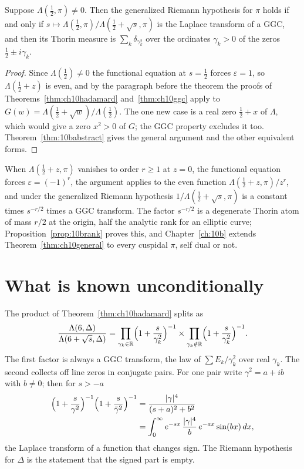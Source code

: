 \begin{theorem}\label{thm:ch10general}
Suppose $\Lambda(\frac12,\pi)\ne0$. Then the generalized Riemann hypothesis for $\pi$ holds if and only if $s\mapsto\Lambda(\frac12,\pi)/\Lambda(\frac12+\sqrt s,\pi)$ is the Laplace transform of a GGC, and then its Thorin measure is $\sum_k\delta_{\gamma_k^2}$ over the ordinates $\gamma_k>0$ of the zeros $\frac12\pm i\gamma_k$.
\end{theorem}

\begin{proof}
Since $\Lambda(\frac12)\ne0$ the functional equation at $s=\frac12$ forces $\varepsilon = 1$, so $\Lambda(\frac12+z)$ is even, and by the paragraph before the theorem the proofs of Theorems~\ref{thm:ch10hadamard} and~\ref{thm:ch10ggc} apply to $G(w) = \Lambda(\frac12+\sqrt w)/\Lambda(\frac12)$. The one new case is a real zero $\frac12+x$ of $\Lambda$, which would give a zero $x^2>0$ of $G$; the GGC property excludes it too. Theorem~\ref{thm:10babstract} gives the general argument and the other equivalent forms.
\end{proof}

When $\Lambda(\frac12+z,\pi)$ vanishes to order $r\ge1$ at $z=0$, the functional equation forces $\varepsilon=(-1)^r$, the argument applies to the even function $\Lambda(\frac12+z,\pi)/z^r$, and under the generalized Riemann hypothesis $1/\Lambda(\frac12+\sqrt s,\pi)$ is a constant times $s^{-r/2}$ times a GGC transform. The factor $s^{-r/2}$ is a degenerate Thorin atom of mass $r/2$ at the origin, half the analytic rank for an elliptic curve; Proposition~\ref{prop:10brank} proves this, and Chapter~\ref{ch:10b} extends Theorem~\ref{thm:ch10general} to every cuspidal $\pi$, self dual or not.

\section{What is known unconditionally}

The product of Theorem~\ref{thm:ch10hadamard} splits as
\[
\frac{\Lambda(6,\Delta)}{\Lambda(6+\sqrt s,\Delta)} = \prod_{\gamma_k\in\mathbb{R}}\Bigl(1+\frac{s}{\gamma_k^2}\Bigr)^{-1}\times\prod_{\gamma_k\notin\mathbb{R}}\Bigl(1+\frac{s}{\gamma_k^2}\Bigr)^{-1}.
\]
The first factor is always a GGC transform, the law of $\sum E_k/\gamma_k^2$ over real $\gamma_k$. The second collects off line zeros in conjugate pairs. For one pair write $\gamma^2 = a+ib$ with $b\ne0$; then for $s>-a$
\begin{align*}
\Bigl(1+\frac{s}{\gamma^2}\Bigr)^{-1}\Bigl(1+\frac{s}{\bar\gamma^2}\Bigr)^{-1} &= \frac{|\gamma|^4}{(s+a)^2+b^2}\\
&= \int_0^\infty e^{-sx}\,\frac{|\gamma|^4}{b}\,e^{-ax}\sin(bx)\,dx,
\end{align*}
the Laplace transform of a function that changes sign. The Riemann hypothesis for $\Delta$ is the statement that the signed part is empty.

